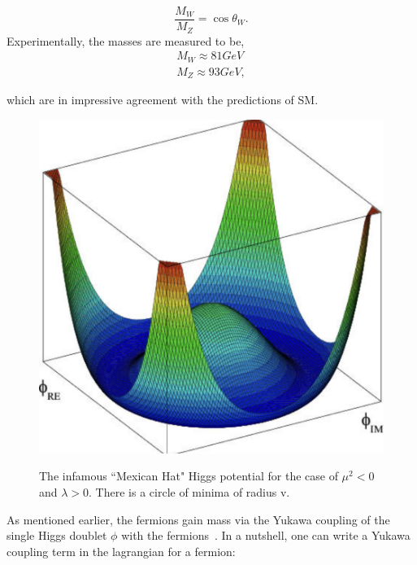 \begin{equation}
    \frac{M_{W}}{M_{Z}} = \cos\theta_{W}.    
\end{equation}
Experimentally, the masses are measured to be,
\begin{equation}
\begin{align}
    M_W \approx 81 GeV \\
    M_Z \approx 93 GeV,
\end{align}
\end{equation}

which are in impressive agreement with the predictions of SM.


\begin{figure}[!htbp]
	\centering
	\caption{The infamous ``Mexican Hat" Higgs potential for the case of $\mu^2 <0$ and $\lambda >0$. There is a circle of minima of radius v.}
    \includegraphics[scale=0.5]{fig/MexicanHat.png}
	\label{fig:MexicanHat}
\end{figure}

As mentioned earlier, the fermions gain mass via the Yukawa coupling of the single Higgs doublet $\phi$ with the fermions~\cite{Nguyen:HiggsMechanism}. In a nutshell, one can write a Yukawa coupling term in the lagrangian for a fermion:

